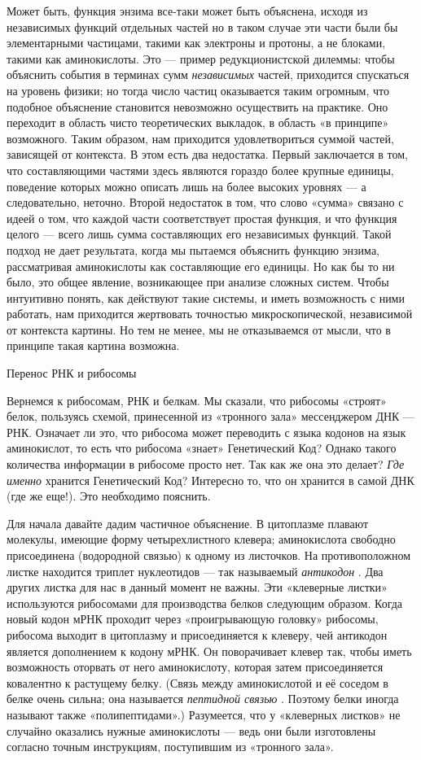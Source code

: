 \documentclass[../main.tex]{subfiles}
\begin{document}
Может быть, функция энзима все-таки может быть объяснена, исходя из независимых функций отдельных частей но в таком случае эти части были бы элементарными частицами, такими как электроны и протоны, а не блоками, такими как аминокислоты. Это --- пример редукционистской дилеммы: чтобы объяснить события в терминах сумм \emph{независимых} частей, приходится спускаться на уровень физики; но тогда число частиц оказывается таким огромным, что подобное объяснение становится невозможно осуществить на практике. Оно переходит в область чисто теоретических выкладок, в область «в принципе» возможного. Таким образом, нам приходится удовлетвориться суммой частей, зависящей от контекста. В этом есть два недостатка. Первый заключается в том, что составляющими частями здесь являются гораздо более крупные единицы, поведение которых можно описать лишь на более высоких уровнях --- а следовательно, неточно. Второй недостаток в том, что слово «сумма» связано с идеей о том, что каждой части соответствует простая функция, и что функция целого --- всего лишь сумма составляющих его независимых функций. Такой подход не дает результата, когда мы пытаемся объяснить функцию энзима, рассматривая аминокислоты как составляющие его единицы. Но как бы то ни было, это общее явление, возникающее при анализе сложных систем. Чтобы интуитивно понять, как действуют такие системы, и иметь возможность с ними работать, нам приходится жертвовать точностью микроскопической, независимой от контекста картины. Но тем не менее, мы не отказываемся от мысли, что в принципе такая картина возможна.

Перенос РНК и рибосомы

Вернемся к рибосомам, РНК и белкам. Мы сказали, что рибосомы «строят» белок, пользуясь схемой, принесенной из «тронного зала» мессенджером ДНК --- РНК\@. Означает ли это, что рибосома может переводить с языка кодонов на язык аминокислот, то есть что рибосома «знает» Генетический Код? Однако такого количества информации в рибосоме просто нет. Так как же она это делает? \emph{Где именно} хранится Генетический Код? Интересно то, что он хранится в самой ДНК (где же еще!). Это необходимо пояснить.

Для начала давайте дадим частичное объяснение. В цитоплазме плавают молекулы, имеющие форму четырехлистного клевера; аминокислота свободно присоединена (водородной связью) к одному из листочков. На противоположном листке находится триплет нуклеотидов --- так называемый \emph{антикодон} . Два других листка для нас в данный момент не важны. Эти «клеверные листки» используются рибосомами для производства белков следующим образом. Когда новый кодон мРНК проходит через «проигрывающую головку» рибосомы, рибосома выходит в цитоплазму и присоединяется к клеверу, чей антикодон является дополнением к кодону мРНК\@. Он поворачивает клевер так, чтобы иметь возможность оторвать от него аминокислоту, которая затем присоединяется ковалентно к растущему белку. (Связь между аминокислотой и её соседом в белке очень сильна; она называется \emph{пептидной связью} . Поэтому белки иногда называют также «полипептидами».) Разумеется, что у «клеверных листков» не случайно оказались нужные аминокислоты --- ведь они были изготовлены согласно точным инструкциям, поступившим из «тронного зала».
\end{document}
